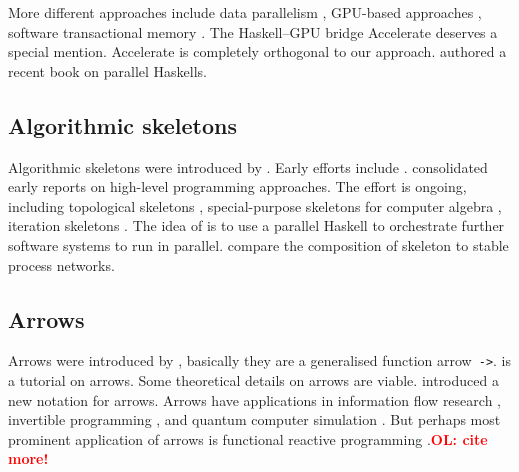 \documentclass{jfp1}
\renewcommand{\cite}[1]{\citep{#1}}
\newcommand{\inlinecode}[1]{\texttt{#1}}
\newcommand{\comm}[2]{\textcolor{red}{\bfseries #1: #2}}
\newcommand{\olcomment}[1]{\comm{OL}{#1}}
\begin{document}
More different approaches include data parallelism \cite{Chakravarty2007,Keller:2010:RSP:1932681.1863582,}, GPU-based approaches \cite{Mainland:2010:NEC:2088456.1863533,obsidian-phd}, software transactional memory \cite{Harris:2005:CMT:1065944.1065952,Perfumo:2008:LST:1366230.1366241}.
%
The Haskell--GPU bridge Accelerate \cite{Chakravarty:2011:AHA:1926354.1926358,CMCK14,McDonell:2015:TRC:2887747.2804313} deserves a special mention. Accelerate is completely orthogonal to our approach. \citeauthor{marlow2013parallel} authored a recent book \citeyear{marlow2013parallel} on parallel Haskells.

\subsection{Algorithmic skeletons}

Algorithmic skeletons were introduced by \citet{Cole1989}.
Early efforts include \cite{darlington1993parallel,botorog1996efficient,p3l97,Gorlatch1998,Lengauer1997}. \citet{SkeletonBook} consolidated early reports on high-level programming approaches.
The effort is ongoing, including topological skeletons \cite{Eden:PARCO05}, special-purpose skeletons for computer algebra \cite{Berthold2009-fft,brown2010ever,lobachev-phd,Lobachev2012}, iteration skeletons \cite{Dieterle2013}. The idea of \citet{scscp} is to use a parallel Haskell to orchestrate further software systems to run in parallel. \citet{dieterle_horstmeyer_loogen_berthold_2016} compare the composition of skeleton to stable process networks.

\subsection{Arrows}

Arrows were introduced by \citet{HughesArrows}, basically they are a generalised function arrow~\inlinecode{->}. \citet{Hughes2005} is a tutorial on arrows. Some theoretical details on arrows \cite{jacobs_heunen_hasuo_2009,LINDLEY201197,ATKEY201119} are viable. \citet{Paterson:2001:NNA:507669.507664} introduced a new notation for arrows. Arrows have applications in information flow research \cite{1648705,LI20101974,Russo:2008:LLI:1411286.1411289}, invertible programming \cite{Alimarine:2005:BAA:1088348.1088357}, and quantum computer simulation \cite{vizzotto_altenkirch_sabry_2006}. But perhaps most prominent application of arrows is functional reactive programming \cite{Hudak2003}.\olcomment{cite more!}
\end{document}
